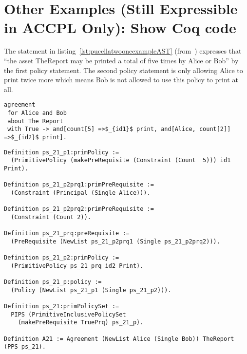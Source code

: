 


\section{Other Examples (Still Expressible in ACCPL Only): Show Coq code}

The statement in listing~\ref{lst:pucellatwooneexampleAST} (from~\cite{pucella2006}) expresses that ``the asset TheReport may be printed a total of five times by Alice or Bob'' by the first policy statement. The second policy statement is only allowing Alice to print twice more which means Bob is not allowed to use this policy to print at all.

\lstset{language=Pucella2006}
\begin{minipage}[c]{0.95\textwidth}
\begin{lstlisting}[frame=single, caption={Agreement of Example 2.1},label={lst:pucellatwooneexampleAST}, mathescape]
agreement
 for Alice and Bob 
 about The Report 
 with True -> and[count[5] =>$_{id1}$ print, and[Alice, count[2]] =>$_{id2}$ print].
\end{lstlisting}
\end{minipage} 

\begin{minipage}[c]{0.95\textwidth}
\begin{lstlisting}
Definition ps_21_p1:primPolicy := 
  (PrimitivePolicy (makePreRequisite (Constraint (Count  5))) id1 Print).

Definition ps_21_p2prq1:primPreRequisite := 
  (Constraint (Principal (Single Alice))).

Definition ps_21_p2prq2:primPreRequisite := 
  (Constraint (Count 2)).

Definition ps_21_prq:preRequisite := 
  (PreRequisite (NewList ps_21_p2prq1 (Single ps_21_p2prq2))).

Definition ps_21_p2:primPolicy := 
  (PrimitivePolicy ps_21_prq id2 Print).

Definition ps_21_p:policy := 
  (Policy (NewList ps_21_p1 (Single ps_21_p2))).

Definition ps_21:primPolicySet :=
  PIPS (PrimitiveInclusivePolicySet
    (makePreRequisite TruePrq) ps_21_p).

Definition A21 := Agreement (NewList Alice (Single Bob)) TheReport (PPS ps_21).
\end{lstlisting}
\end{minipage} 

